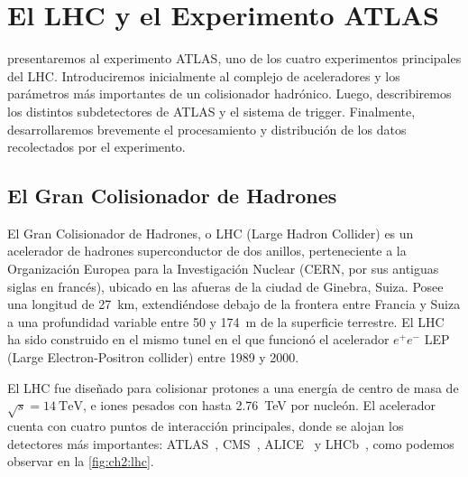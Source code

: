 \chapter{El LHC y el Experimento ATLAS} \label{chap:ch2}

 presentaremos al experimento ATLAS, uno de los cuatro experimentos principales del LHC. Introduciremos inicialmente al complejo de aceleradores y los parámetros más importantes de un colisionador hadrónico. Luego, describiremos los distintos subdetectores de ATLAS y el sistema de trigger. Finalmente, desarrollaremos brevemente el procesamiento y distribución de los datos recolectados por el experimento.


\section{El Gran Colisionador de Hadrones}

El Gran Colisionador de Hadrones, o LHC (Large Hadron Collider) \cite{Brüning:782076} es un acelerador de hadrones superconductor de dos anillos, perteneciente a la Organización Europea para la Investigación Nuclear (CERN, por sus antiguas siglas en francés), ubicado en las afueras de la ciudad de Ginebra, Suiza. Posee una longitud de \SI{27}{km}, extendiéndose debajo de la frontera entre Francia y Suiza a una profundidad variable entre 50 y \SI{174}{m} de la superficie terrestre. El LHC ha sido construido en el mismo tunel en el que funcionó el acelerador $e^+ e^-$ LEP (Large Electron-Positron collider) \cite{Wyss1996} entre 1989 y 2000.

El LHC fue diseñado para colisionar protones a una energía de centro de masa de $\sqrt{s} = \SI{14}{\TeV}$, e iones pesados con hasta \SI{2.76}{\TeV} por nucleón. El acelerador cuenta con cuatro puntos de interacción principales, donde se alojan los detectores más importantes: ATLAS~\cite{Aad2008}, CMS~\cite{Chatrchyan2008}, ALICE~\cite{Aamodt2008} y LHCb~\cite{AugustoAlves2008}, como podemos observar en la \cref{fig:ch2:lhc}.

